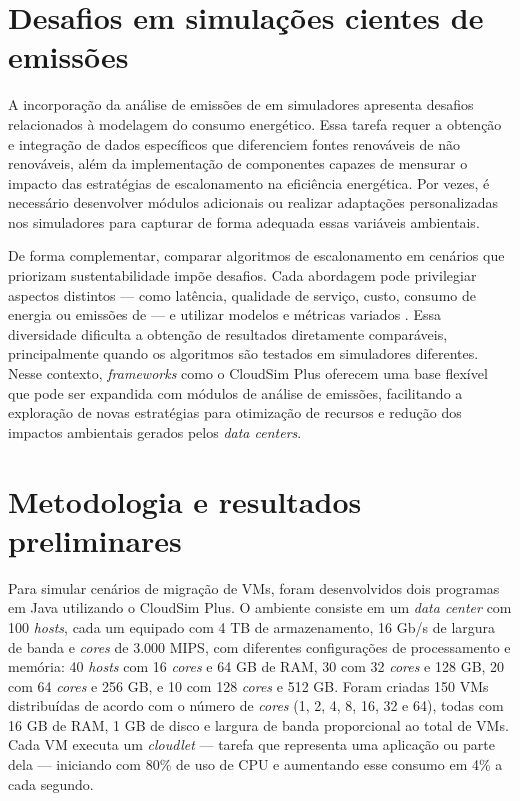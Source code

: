 \documentclass[12pt]{article}
\begin{document}
\section{Desafios em simulações cientes de emissões}

A incorporação da análise de emissões de  em simuladores apresenta desafios relacionados à modelagem do consumo energético. Essa tarefa requer a obtenção e integração de dados específicos que diferenciem fontes renováveis de não renováveis, além da implementação de componentes capazes de mensurar o impacto das estratégias de escalonamento na eficiência energética. Por vezes, é necessário desenvolver módulos adicionais ou realizar adaptações personalizadas nos simuladores para capturar de forma adequada essas variáveis ambientais.

De forma complementar, comparar algoritmos de escalonamento em cenários que priorizam sustentabilidade impõe desafios. Cada abordagem pode privilegiar aspectos distintos --- como latência, qualidade de serviço, custo, consumo de energia ou emissões de  --- e utilizar modelos e métricas variados \cite{kumar:19}. Essa diversidade dificulta a obtenção de resultados diretamente comparáveis, principalmente quando os algoritmos são testados em simuladores diferentes. Nesse contexto, \textit{frameworks} como o CloudSim Plus \cite{silva:17} oferecem uma base flexível que pode ser expandida com módulos de análise de emissões, facilitando a exploração de novas estratégias para otimização de recursos e redução dos impactos ambientais gerados pelos \textit{data centers}.

\section{Metodologia e resultados preliminares}

Para simular cenários de migração de VMs, foram desenvolvidos dois programas em Java utilizando o CloudSim Plus. O ambiente consiste em um \textit{data center} com 100 \textit{hosts}, cada um equipado com 4 TB de armazenamento, 16 Gb/s de largura de banda e \textit{cores} de 3.000 MIPS, com diferentes configurações de processamento e memória: 40 \textit{hosts} com 16 \textit{cores} e 64 GB de RAM, 30 com 32 \textit{cores} e 128 GB, 20 com 64 \textit{cores} e 256 GB, e 10 com 128 \textit{cores} e 512 GB. Foram criadas 150 VMs distribuídas de acordo com o número de \textit{cores} (1, 2, 4, 8, 16, 32 e 64), todas com 16 GB de RAM, 1 GB de disco e largura de banda proporcional ao total de VMs. Cada VM executa um \textit{cloudlet} --- tarefa que representa uma aplicação ou parte dela --- iniciando com 80\% de uso de CPU e aumentando esse consumo em 4\% a cada segundo.
\end{document}

